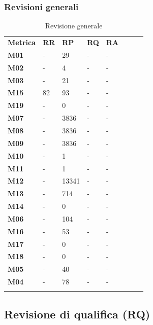 \subsubsection{Revisioni generali}\mbox{}
\begin{longtable} {						
		>{}p{50mm}  		
		>{}p{8mm}		
		>{}p{8mm}		
		>{}p{8mm}		
		>{}p{8mm}		
		>{}p{8mm}		
		>{}p{8mm}
		>{}p{8mm}				
	}			
	\rowcolor{gray!50}
	\textbf{Metrica} & \textbf{RR} & \textbf{RP} & \textbf{RQ} & \textbf{RA} \TBstrut \\ [2mm]
	\textbf{M01} & - & 29 & - & - \TBstrut \\ [2mm]
	\textbf{M02} & - & 4 & - & - \TBstrut \\ [2mm]
	\textbf{M03} & - & 21 & - & - \TBstrut \\ [2mm]
	\textbf{M15} & 82 & 93 & - & - \TBstrut \\ [2mm]
	\textbf{M19} & - & 0 & - & - \TBstrut \\ [2mm]
	\textbf{M07} & - & 3836 & - & - \TBstrut \\ [2mm]
	\textbf{M08} & - & 3836 & - & - \TBstrut \\ [2mm]
	\textbf{M09} & - & 3836 & - & - \TBstrut \\ [2mm]
	\textbf{M10} & - & 1 & - & - \TBstrut \\ [2mm]
	\textbf{M11} & - & 1 & - & - \TBstrut \\ [2mm]
	\textbf{M12} & - & 13341 & - & - \TBstrut \\ [2mm]
	\textbf{M13} & - & 714 & - & - \TBstrut \\ [2mm]
	\textbf{M14} & - & 0 & - & - \TBstrut \\ [2mm]
	\textbf{M06} & - & 104 & - & - \TBstrut \\ [2mm]
	\textbf{M16} & - & 53 & - & - \TBstrut \\ [2mm]
	\textbf{M17} & - & 0 & - & - \TBstrut \\ [2mm]
	\textbf{M18} & - & 0 & - & - \TBstrut \\ [2mm]
	\textbf{M05} & - & 40 & - & - \TBstrut \\ [2mm]
	\textbf{M04} & - & 78 & - & - \TBstrut \\ [2mm]
	\rowcolor{white}
	\caption{Revisione generale}
\end{longtable}




\subsection{Revisione di qualifica (RQ)}
